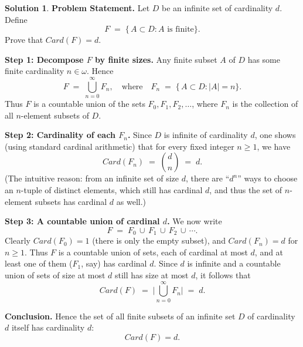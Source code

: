 \documentclass[12pt]{article}
\theoremstyle{definition} %
\newtheorem{solution}{Solution}
\theoremstyle{plain} %
\begin{document}
\begin{solution}
    \noindent
    \textbf{Problem Statement.} 
    Let $D$ be an infinite set of cardinality $d$. Define 
    \[
    F \;=\;\{\,A \subset D : A\text{ is finite}\}.
    \]
    Prove that $Card(F) = d$.
    
    \bigskip
    \noindent
    \textbf{Step 1: Decompose $F$ by finite sizes.}
    Any finite subset $A$ of $D$ has some finite cardinality $n \in \omega$. 
    Hence 
    \[
    F \;=\; \bigcup_{n=0}^{\infty} F_n,
    \quad\text{where}\quad
    F_n \;=\; \{\,A \subset D : |A| = n\}.
    \]
    Thus $F$ is a countable union of the sets $F_0, F_1, F_2, \dots$, 
    where $F_n$ is the collection of all $n$-element subsets of $D$.  
    
    \medskip
    \noindent
    \textbf{Step 2: Cardinality of each $F_n$.}
    Since $D$ is infinite of cardinality $d$, one shows (using standard cardinal arithmetic) 
    that for every fixed integer $n \ge 1$, we have
    \[
    Card(F_n) \;=\; \binom{d}{n} \;=\; d.
    \]
    (The intuitive reason: from an infinite set of size $d$, there are ``$d^n$'' ways 
    to choose an $n$-tuple of distinct elements, which still has cardinal $d$, and thus 
    the set of $n$-element subsets has cardinal $d$ as well.)
    
    \medskip
    \noindent
    \textbf{Step 3: A countable union of cardinal $d$.}
    We now write 
    \[
    F \;=\; F_0 \,\cup\, F_1 \,\cup\, F_2 \,\cup\, \cdots.
    \]
    Clearly $Card(F_0) = 1$ (there is only the empty subset), 
    and $Card(F_n) = d$ for $n \ge 1$.  
    Thus $F$ is a countable union of sets, each of cardinal at most $d$, 
    and at least one of them ($F_1$, say) has cardinal $d$.  
    Since $d$ is infinite and a countable union of sets of size at most $d$ still has size at most $d$, 
    it follows that
    \[
    Card(F)
    \;=\;
    \bigl|\bigcup_{n=0}^{\infty} F_n\bigr|
    \;=\; d.
    \]
    
    \medskip
    \noindent
    \textbf{Conclusion.}
    Hence the set of all finite subsets of an infinite set $D$ of cardinality $d$ itself has cardinality $d$:
    \[
    Card(F) = d.
    \] 
\end{solution}
\end{document}
